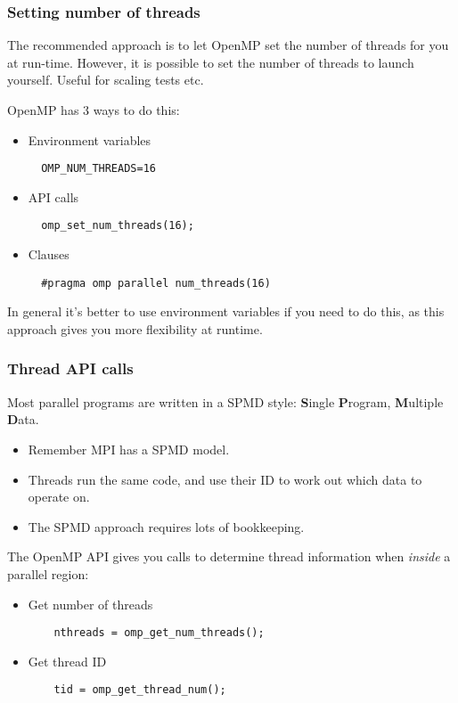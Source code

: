 \documentclass{beamer}
\begin{document}
\begin{frame}[fragile]
\frametitle{Setting number of threads}
The recommended approach is to let OpenMP set the number of threads for you at run-time. However, it is possible to set the number of threads to launch yourself. Useful for scaling tests etc.

OpenMP has 3 ways to do this:
\begin{itemize}
  \item Environment variables
  \begin{verbatim}
  OMP_NUM_THREADS=16
  \end{verbatim}

  \item API calls
  \begin{verbatim}
  omp_set_num_threads(16);
  \end{verbatim}

  \item Clauses
  \begin{verbatim}
  #pragma omp parallel num_threads(16)
  \end{verbatim}
\end{itemize}

In general it's better to use environment variables if you need to do this, as this approach gives you more flexibility at runtime.
\end{frame}

\begin{frame}[fragile]
\frametitle{Thread API calls}
Most parallel programs are written in a SPMD style: \newline
{\bf S}ingle {\bf P}rogram, {\bf M}ultiple {\bf D}ata.
\begin{itemize}
  \item Remember MPI has a SPMD model.
  \item Threads run the same code, and use their ID to work out which data to operate on.
  \item The SPMD approach requires lots of bookkeeping.
\end{itemize}

The OpenMP API gives you calls to determine thread information when \emph{inside} a parallel region:
\begin{itemize}
  \item Get number of threads
    \begin{verbatim}
    nthreads = omp_get_num_threads();
    \end{verbatim}

  \item Get thread ID
    \begin{verbatim}
    tid = omp_get_thread_num();
    \end{verbatim}

\end{itemize}
\end{frame}
\end{document}
